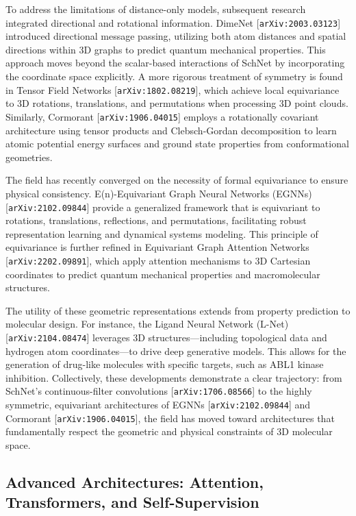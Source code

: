 \documentclass[11pt]{article}
\begin{document}
To address the limitations of distance-only models, subsequent research integrated directional and rotational information. DimeNet [\texttt{arXiv:2003.03123}] introduced directional message passing, utilizing both atom distances and spatial directions within 3D graphs to predict quantum mechanical properties. This approach moves beyond the scalar-based interactions of SchNet by incorporating the coordinate space explicitly. A more rigorous treatment of symmetry is found in Tensor Field Networks [\texttt{arXiv:1802.08219}], which achieve local equivariance to 3D rotations, translations, and permutations when processing 3D point clouds. Similarly, Cormorant [\texttt{arXiv:1906.04015}] employs a rotationally covariant architecture using tensor products and Clebsch-Gordan decomposition to learn atomic potential energy surfaces and ground state properties from conformational geometries.

The field has recently converged on the necessity of formal equivariance to ensure physical consistency. E(n)-Equivariant Graph Neural Networks (EGNNs) [\texttt{arXiv:2102.09844}] provide a generalized framework that is equivariant to rotations, translations, reflections, and permutations, facilitating robust representation learning and dynamical systems modeling. This principle of equivariance is further refined in Equivariant Graph Attention Networks [\texttt{arXiv:2202.09891}], which apply attention mechanisms to 3D Cartesian coordinates to predict quantum mechanical properties and macromolecular structures.

The utility of these geometric representations extends from property prediction to molecular design. For instance, the Ligand Neural Network (L-Net) [\texttt{arXiv:2104.08474}] leverages 3D structures—including topological data and hydrogen atom coordinates—to drive deep generative models. This allows for the generation of drug-like molecules with specific targets, such as ABL1 kinase inhibition. Collectively, these developments demonstrate a clear trajectory: from SchNet’s continuous-filter convolutions [\texttt{arXiv:1706.08566}] to the highly symmetric, equivariant architectures of EGNNs [\texttt{arXiv:2102.09844}] and Cormorant [\texttt{arXiv:1906.04015}], the field has moved toward architectures that fundamentally respect the geometric and physical constraints of 3D molecular space.

\subsection{Advanced Architectures: Attention, Transformers, and Self-Supervision}
\end{document}
